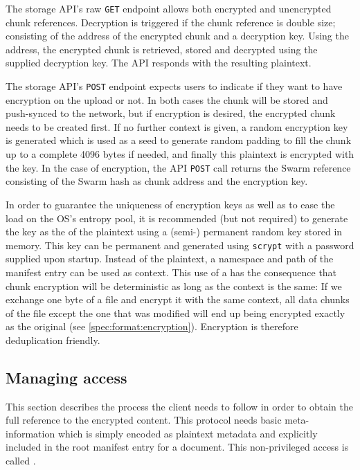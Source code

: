 
The storage API's raw \lstinline{GET} endpoint allows both encrypted and unencrypted chunk references. 
Decryption is triggered if the chunk reference is double size; consisting of the address of the encrypted chunk and a decryption key. Using the address, the encrypted chunk is retrieved, stored and decrypted using the supplied decryption key. The API responds with the resulting plaintext.

The storage API's \lstinline{POST} endpoint expects users to indicate if they want to have encryption on the upload or not. In both cases the chunk will be stored and push-synced to the network, but if encryption is desired, the encrypted chunk needs to be created first. If no further context is given, a random encryption key is generated which is used as a seed to generate random padding to fill the chunk up to a complete 4096 bytes if needed, and finally this plaintext is encrypted with the key. In the case of encryption, the API \lstinline{POST} call returns the Swarm reference consisting of the Swarm hash as chunk address and the encryption key. 

In order to guarantee the uniqueness of encryption keys as well as to ease the load on the OS's entropy pool, it is recommended (but not required) to generate the key as the  of the plaintext using a (semi-) permanent random key stored in memory. 
This key can be permanent and generated using \lstinline{scrypt} \cite{percival2009stronger}
with a password supplied upon startup. Instead of the plaintext, a namespace and path of the manifest entry can be used as context.
This use of a  has the consequence that chunk encryption will be deterministic as long as the context is the same: If we exchange one byte of a file and encrypt it with the same context, all data chunks of the file except the one that was modified will end up being encrypted exactly as the original (see \ref{spec:format:encryption}). Encryption is therefore deduplication friendly. 


\subsection{Managing access\statusgreen}\label{sec:managing-access}

This section describes the process the client needs to follow in order to obtain the full reference to the encrypted content. This protocol needs basic meta-information which is simply encoded as plaintext metadata and explicitly included in the root manifest entry for a document. This non-privileged access is called .

